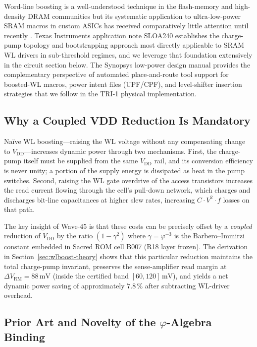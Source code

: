 Word-line boosting is a well-understood technique in the flash-memory
and high-density DRAM communities but its systematic application to
ultra-low-power SRAM macros in custom ASICs has received comparatively
little attention until recently \cite{ti_sloa240}.  Texas Instruments
application note SLOA240 establishes the charge-pump topology and
bootstrapping approach most directly applicable to SRAM WL drivers in
sub-threshold regimes, and we leverage that foundation extensively in
the circuit section below.  The Synopsys low-power design manual
\cite{synopsys_lpdm} provides the complementary perspective of
automated place-and-route tool support for boosted-WL macros, power
intent files (\textsc{UPF}/\textsc{CPF}), and level-shifter insertion
strategies that we follow in the TRI-1 physical implementation.

\subsection{Why a Coupled VDD Reduction Is Mandatory}

Naïve WL boosting—raising the WL voltage without any compensating
change to $V_{\mathrm{DD}}$—increases dynamic power through two
mechanisms.  First, the charge-pump itself must be supplied from the
same $V_{\mathrm{DD}}$ rail, and its conversion efficiency is never
unity; a portion of the supply energy is dissipated as heat in the
pump switches.  Second, raising the WL gate overdrive of the access
transistors increases the read current flowing through the cell's pull-down
network, which charges and discharges bit-line capacitances at higher
slew rates, increasing $C \cdot V^{2} \cdot f$ losses on that path.

The key insight of Wave-45 is that these costs can be precisely offset
by a \emph{coupled} reduction of $V_{\mathrm{DD}}$ by the ratio
$(1 - \gamma^{2})$ where $\gamma = \varphi^{-3}$ is the
Barbero--Immirzi constant embedded in Sacred ROM cell B007 (R18 layer
frozen).  The derivation in Section~\ref{sec:wlboost-theory} shows
that this particular reduction maintains the total charge-pump
invariant, preserves the sense-amplifier read margin at
$\Delta V_{\mathrm{RM}} = 88\,\text{mV}$ (inside the certified band
$[60, 120]\,\text{mV}$), and yields a net dynamic power saving of
approximately $7.8\,\%$ after subtracting WL-driver overhead.

\subsection{Prior Art and Novelty of the \texorpdfstring{$\varphi$}{phi}-Algebra Binding}

